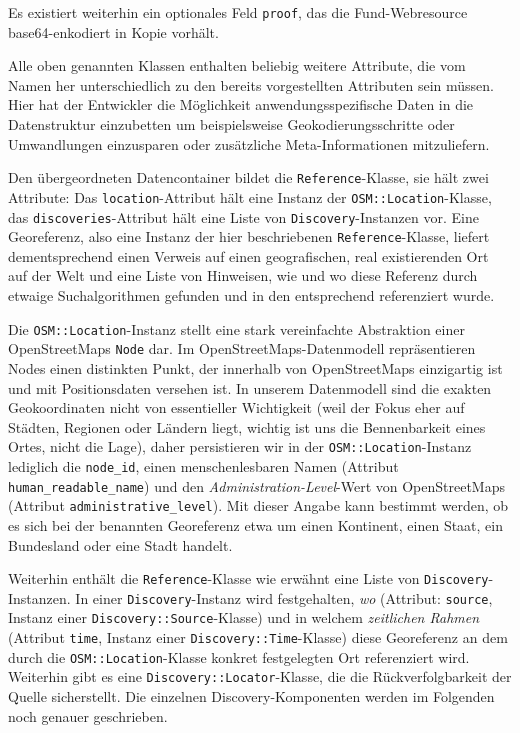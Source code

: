 Es existiert weiterhin ein optionales Feld \texttt{proof}, das die Fund-Webresource base64-enkodiert in Kopie vorhält.

Alle oben genannten Klassen enthalten beliebig weitere Attribute, die vom Namen her unterschiedlich zu den bereits vorgestellten Attributen sein müssen. Hier hat der Entwickler die Möglichkeit anwendungsspezifische Daten in die Datenstruktur einzubetten um beispielsweise Geokodierungsschritte oder Umwandlungen einzusparen oder zusätzliche Meta-Informationen mitzuliefern.

Den übergeordneten Datencontainer bildet die \texttt{Reference}-Klasse, sie hält zwei Attribute: Das \texttt{location}-Attribut hält eine Instanz der \texttt{OSM::Location}-Klasse, das \texttt{discoveries}-Attribut hält eine Liste von \texttt{Discovery}-Instanzen vor. Eine Georeferenz, also eine Instanz der hier beschriebenen  \texttt{Reference}-Klasse, liefert dementsprechend einen Verweis auf einen geografischen, real existierenden Ort auf der Welt und eine Liste von Hinweisen, wie und wo diese Referenz durch etwaige Suchalgorithmen gefunden und in den entsprechend referenziert wurde.

Die \texttt{OSM::Location}-Instanz stellt eine stark vereinfachte Abstraktion einer OpenStreetMaps \texttt{Node}\cite{OSMnode} dar. Im OpenStreetMaps-Datenmodell repräsentieren Nodes einen distinkten Punkt, der innerhalb von OpenStreetMaps einzigartig ist und mit Positionsdaten versehen ist. In unserem Datenmodell sind die exakten Geokoordinaten nicht von essentieller Wichtigkeit (weil der Fokus eher auf Städten, Regionen oder Ländern liegt, wichtig ist uns die Bennenbarkeit eines Ortes, nicht die Lage), daher persistieren wir in der \texttt{OSM::Location}-Instanz lediglich die \texttt{node\_id}, einen menschenlesbaren Namen (Attribut \texttt{human\_readable\_name}) und den \textit{Administration-Level}-Wert von OpenStreetMaps\cite{OSMadminlevel} (Attribut \texttt{administrative\_level}). Mit dieser Angabe kann bestimmt werden, ob es sich bei der benannten Georeferenz etwa um einen Kontinent, einen Staat, ein Bundesland oder eine Stadt handelt.

Weiterhin enthält die \texttt{Reference}-Klasse wie erwähnt eine Liste von \texttt{Discovery}-Instanzen. In einer \texttt{Discovery}-Instanz wird festgehalten, \textit{wo} (Attribut: \texttt{source}, Instanz einer \texttt{Discovery::Source}-Klasse) und in welchem \textit{zeitlichen Rahmen} (Attribut \texttt{time}, Instanz einer \texttt{Discovery::Time}-Klasse) diese Georeferenz an dem durch die \texttt{OSM::Location}-Klasse konkret festgelegten Ort referenziert wird. Weiterhin gibt es eine \texttt{Discovery::Locator}-Klasse, die die Rückverfolgbarkeit der Quelle sicherstellt. Die einzelnen Discovery-Komponenten werden im Folgenden noch genauer geschrieben.

